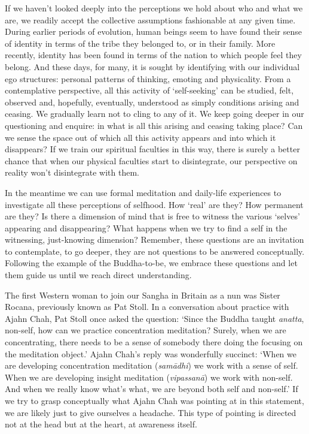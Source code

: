 If we haven’t looked deeply into the perceptions we hold about who and
what we are, we readily accept the collective assumptions fashionable at
any given time. During earlier periods of evolution, human beings seem
to have found their sense of identity in terms of the tribe they
belonged to, or in their family. More recently, identity has been found
in terms of the nation to which people feel they belong. And these days,
for many, it is sought by identifying with our individual ego
structures: personal patterns of thinking, emoting and physicality. From
a contemplative perspective, all this activity of ‘self-seeking’ can be
studied, felt, observed and, hopefully, eventually, understood as simply
conditions arising and ceasing. We gradually learn not to cling to any
of it. We keep going deeper in our questioning and enquire: in what is
all this arising and ceasing taking place? Can we sense the space out of
which all this activity appears and into which it disappears? If we
train our spiritual
faculties\cite{faculties}
in this way, there is surely a better
chance that when our physical faculties start to disintegrate, our
perspective on reality won’t disintegrate with them.

In the meantime we can use formal meditation and daily-life experiences
to investigate all these perceptions of selfhood. How ‘real’ are they?
How permanent are they? Is there a dimension of mind that is free to
witness the various ‘selves’ appearing and disappearing? What happens
when we try to find a self in the witnessing, just-knowing dimension?
Remember, these questions are an invitation to contemplate, to go
deeper, they are not questions to be answered conceptually. Following
the example of the Buddha-to-be, we embrace these questions and let them
guide us until we reach direct understanding.

The first Western woman to join our Sangha in Britain as a nun was
Sister Rocana, previously known as Pat Stoll. In a conversation about
practice with Ajahn Chah, Pat Stoll once asked the question: ‘Since the
Buddha taught \emph{anatta}, non-self, how can we practice concentration
meditation? Surely, when we are concentrating, there needs to be a sense
of somebody there doing the focusing on the meditation object.’ Ajahn
Chah’s reply was wonderfully succinct: ‘When we are developing
concentration meditation (\emph{samādhi}) we work with a sense of self. When
we are developing insight meditation (\emph{vipassanā}) we work with
non-self. And when we really know what’s what, we are beyond both self
and non-self.’ If we try to grasp conceptually what Ajahn Chah was
pointing at in this statement, we are likely just to give ourselves a
headache. This type of pointing is directed not at the head but at the
heart, at awareness itself.

